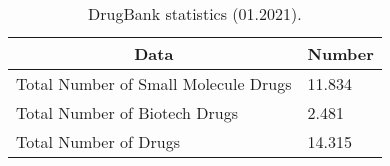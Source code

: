 \begin{table}[]
\caption{DrugBank statistics (01.2021).}
\centering
\begin{tabular}{|l|l|}
\hline
\multicolumn{1}{|c|}{\textbf{Data}}  & \multicolumn{1}{c|}{\textbf{Number}} \\ \hline
Total Number of Small Molecule Drugs & 11.834                               \\ \hline
Total Number of Biotech Drugs        & 2.481                                \\ \hline
Total Number of Drugs                & 14.315                               \\ \hline
\end{tabular}
\label{tab:drugbank_stats}
\end{table}